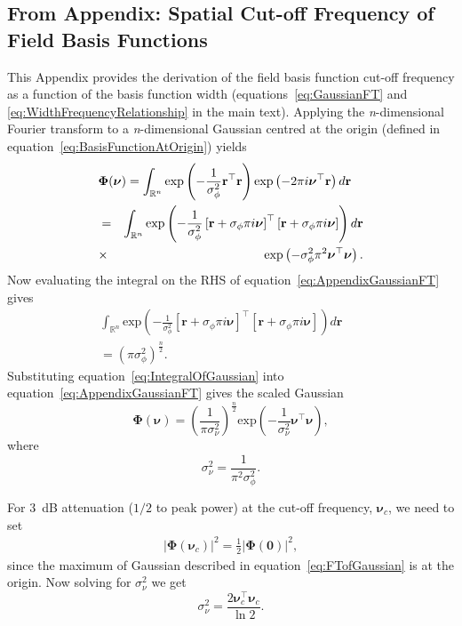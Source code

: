 \documentclass[10pt]{article}
\begin{document}
\subsection*{From Appendix: Spatial Cut-off Frequency of Field Basis Functions}\label{ap:FrequencyAnalysis}
This Appendix provides the derivation of the field basis function cut-off frequency as a function of the basis function width (equations~\ref{eq:GaussianFT} and \ref{eq:WidthFrequencyRelationship} in the main text). Applying the \textit{n}-dimensional Fourier transform \cite{Arsac1966} to a \textit{n}-dimensional Gaussian centred at the origin (defined in equation~\ref{eq:BasisFunctionAtOrigin}) yields
\begin{eqnarray}\label{eq:AppendixGaussianFT}
 \lefteqn{\boldsymbol\Phi(\boldsymbol \nu)=\int_{\mathbb{R}^n}{\mathrm{exp}\left({-\frac{1}{\sigma_{\phi}^2}\mathbf r^\top\mathbf r}\right)\mathrm{exp}\left(-2\pi i\boldsymbol\nu^\top\mathbf r\right)d\mathbf r}} \nonumber \\
&=&\int_{\mathbb{R}^n}\mathrm{exp}\left(-\frac{1}{\sigma_{\phi}^2}\left[\mathbf r +\sigma_{\phi}\pi i \boldsymbol\nu\right]^\top\left[\mathbf r +\sigma_{\phi}\pi i \boldsymbol\nu\right]\right)d\mathbf r \nonumber \\
&\times& \mathrm{exp}\left(-\sigma_{\phi}^2\pi^2\boldsymbol\nu^\top \boldsymbol\nu\right).
\end{eqnarray}
Now evaluating the integral on the RHS of equation~\ref{eq:AppendixGaussianFT} gives 
\begin{eqnarray}\label{eq:IntegralOfGaussian}
\int_{\mathbb{R}^n}\mathrm{exp}\left(-\frac{1}{\sigma_{\phi}^2}\left[\mathbf r +\sigma_{\phi}\pi i \boldsymbol\nu\right]^\top\left[\mathbf r +\sigma_{\phi}\pi i \boldsymbol\nu\right]\right)d\mathbf r&& \nonumber \\
=\left(\pi\sigma_{\phi}^2\right)^{\frac{n}{2}}.&&
\end{eqnarray}
Substituting equation~\ref{eq:IntegralOfGaussian} into equation~\ref{eq:AppendixGaussianFT} gives the scaled Gaussian
\begin{equation}\label{eq:FTofGaussian}
\boldsymbol\Phi(\boldsymbol \nu)=\left(\frac{1}{\pi\sigma_{\nu}^2}\right)^{\frac{n}{2}}\mathrm{exp}\left(-\frac{1}{\sigma_{\nu}^2}\boldsymbol\nu^\top \boldsymbol\nu\right),
\end{equation} 
where 
\begin{equation}
	\sigma_{\nu}^2=\frac{1}{\pi^2\sigma_{\phi}^2}. 
\end{equation}

For $3$~dB attenuation ($1/2$ to peak power) at the cut-off frequency, $\boldsymbol\nu_c$, we need to set
\begin{eqnarray}
 \left|\boldsymbol\Phi(\boldsymbol\nu_{c})\right|^2=\frac{1}{2}\left|\boldsymbol\Phi(\mathbf 0)\right|^2,
\end{eqnarray}
since the maximum of Gaussian described in equation~\ref{eq:FTofGaussian} is at the origin. Now solving for $\sigma_{\nu}^2$ we get
\begin{equation}
 \sigma_{\nu}^2=\frac{2\boldsymbol\nu_{c}^\top \boldsymbol\nu_{c}}{\ln 2 }.
\end{equation}
\end{document}
